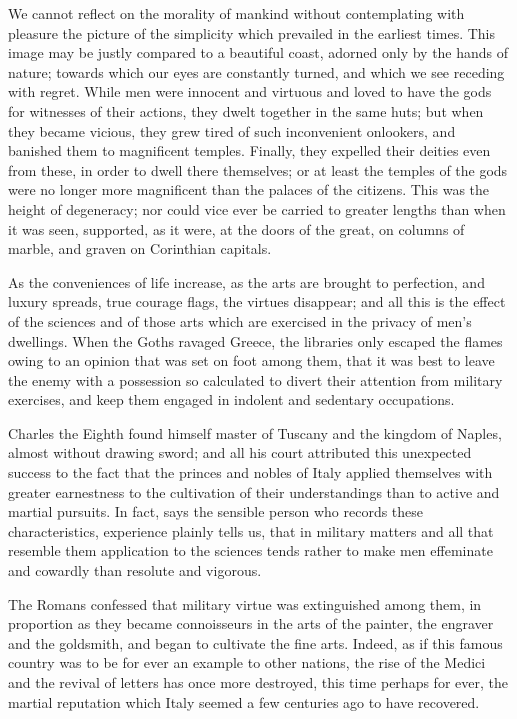 We cannot reflect on the morality of mankind without contemplating
with pleasure the picture of the simplicity which prevailed in the
earliest times. This image may be justly compared to a beautiful
coast, adorned only by the hands of nature; towards which our eyes are
constantly turned, and which we see receding with regret. While men
were innocent and virtuous and loved to have the gods for witnesses of
their actions, they dwelt together in the same huts; but when they
became vicious, they grew tired of such inconvenient onlookers, and
banished them to magnificent temples. Finally, they expelled their
deities even from these, in order to dwell there themselves; or at
least the temples of the gods were no longer more magnificent than the
palaces of the citizens. This was the height of degeneracy; nor could
vice ever be carried to greater lengths than when it was seen,
supported, as it were, at the doors of the great, on columns of
marble, and graven on Corinthian capitals.

As the conveniences of life increase, as the arts are brought to
perfection, and luxury spreads, true courage flags, the virtues
disappear; and all this is the effect of the sciences and of those
arts which are exercised in the privacy of men's dwellings. When the
Goths ravaged Greece, the libraries only escaped the flames owing to
an opinion that was set on foot among them, that it was best to leave
the enemy with a possession so calculated to divert their attention
from military exercises,  and keep them engaged in indolent
and sedentary occupations.

Charles the Eighth found himself master of Tuscany and the kingdom of
Naples, almost without drawing sword; and all his court attributed
this unexpected success to the fact that the princes and nobles of
Italy applied themselves with greater earnestness to the cultivation
of their understandings than to active and martial pursuits. In fact,
says the sensible person who records these characteristics, experience
plainly tells us, that in military matters and all that resemble them
application to the sciences tends rather to make men effeminate and
cowardly than resolute and vigorous.

The Romans confessed that military virtue was extinguished among them,
in proportion as they became connoisseurs in the arts of the painter,
the engraver and the goldsmith, and began to cultivate the fine arts.
Indeed, as if this famous country was to be for ever an example to
other nations, the rise of the Medici and the revival of letters has
once more destroyed, this time perhaps for ever, the martial
reputation which Italy seemed a few centuries ago to have recovered.

